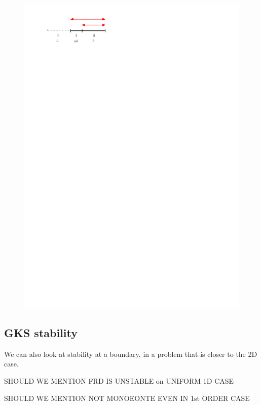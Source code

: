 \begin{figure}
    \centering
    \includegraphics{figs/consistency.pdf}
    \caption{}
    \label{fig:consistency}
\end{figure}

\subsection{GKS stability}
We can also look at stability at a boundary, in a problem that is closer
to the 2D case. 


SHOULD WE MENTION FRD IS UNSTABLE on UNIFORM 1D CASE

SHOULD WE MENTION NOT MONOEONTE EVEN IN 1st ORDER CASE
